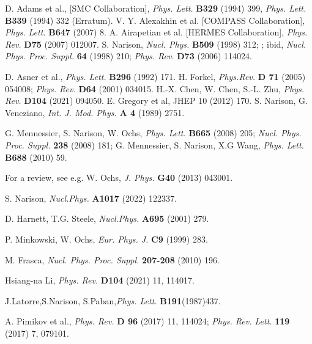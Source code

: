  D. Adams et al., [SMC Collaboration], {\it Phys. Lett.} {\bf B329} (1994) 399, {\it Phys. Lett.} {\bf B339} (1994) 332 (Erratum). 
  V. Y. Alexakhin et al. [COMPASS Collaboration], {\it Phys. Lett.} {\bf B647} (2007) 8.
 A. Airapetian et al. [HERMES Collaboration], {\it Phys. Rev.} {\bf D75} (2007) 012007.
S. Narison, {\it Nucl. Phys.} {\bf B509} (1998) 312; ; ibid, 
{\it Nucl. Phys. Proc. Suppl.} {\bf 64} (1998) 210;  {\it Phys. Rev.} {\bf D73} (2006) 114024. 

D. Asner et al., {\it Phys. Lett.} {\bf B296}  (1992) 171.
  H. Forkel, {\it Phys.Rev.} {\bf D 71} (2005) 054008;  {\it Phys. Rev.} {\bf D64} (2001) 034015.
  H.-X. Chen, W. Chen, S.-L. Zhu, {\it Phys. Rev.} {\bf D104} (2021) 094050.
  E. Gregory et al, JHEP 10 (2012) 170.%
 S. Narison, G. Veneziano, {\it Int. J. Mod. Phys.}  {\bf A 4} (1989) 2751.

 G. Mennessier, S. Narison, W. Ochs, {\it Phys. Lett.} {\bf B665} (2008) 205; {\it Nucl. Phys. Proc. Suppl.} {\bf 238} (2008) 181; 
G. Mennessier, S. Narison,  X.G Wang,  {\it Phys. Lett.} {\bf B688} (2010) 59.

  For a review, see e.g. W. Ochs, {\it J. Phys.} {\bf G40} (2013) 043001.

 S. Narison, {\it Nucl.Phys.} {\bf A1017} (2022) 122337.

D. Harnett, T.G. Steele, {\it Nucl.Phys.} {\bf A695} (2001) 279.

 P. Minkowski,  W. Ochs, {\it Eur. Phys. J.} {\bf C9} (1999) 283.

 M. Frasca, {\it Nucl. Phys. Proc. Suppl.} {\bf 207-208} (2010) 196.

 Hsiang-na Li, {\it Phys. Rev.} {\bf D104} (2021) 11, 114017.

 J.Latorre,S.Narison, S.Paban,{\it Phys. Lett.} {\bf B191}(1987)437.

A. Pimikov et al., {\it Phys. Rev.} {\bf D 96} (2017) 11, 114024; {\it Phys. Rev. Lett.} {\bf 119} (2017) 7, 079101.

